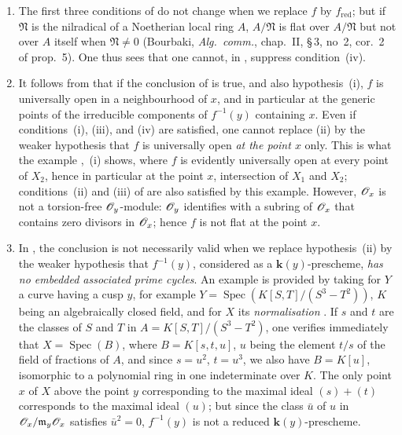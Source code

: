 \begin{remarks}[15.2.4]
\label{IV.15.2.4}
\begin{enumerate}[label=(\roman*)]
  \item The first three conditions of  do not change when we replace $f$ by $f_\mathrm{red}$; but if $\mathfrak{N}$ is the nilradical of a Noetherian local ring $A$, $A/\mathfrak{N}$ is flat over $A/\mathfrak{N}$ but not over $A$ itself when $\mathfrak{N}\neq 0$ (Bourbaki, \emph{Alg.\ comm.}, chap.~II, \S\,3, no~2, cor.~2 of prop.~5).
One thus sees that one cannot, in , suppress condition~(iv).
  \item It follows from  that if the conclusion of  is true, and also hypothesis~(i), $f$ is universally open in a neighbourhood of $x$, and in particular at the generic points of the irreducible components of $f^{-1}(y)$ containing $x$.
Even if conditions~(i), (iii), and (iv) are satisfied, one cannot replace (ii) by the weaker hypothesis that $f$ is universally open \emph{at the point $x$} only.
This is what the example ,~(i) shows, where $f$ is evidently universally open at every point of $X_2$, hence in particular at the point $x$, intersection of $X_1$ and $X_2$; conditions~(ii) and (iii) of  are also satisfied by this example.
However, $\mathscr{O}_x$ is not a torsion-free $\mathscr{O}_y$-module: $\mathscr{O}_y$ identifies with a subring of $\mathscr{O}_x$ that contains zero divisors in $\mathscr{O}_x$; hence $f$ is not flat at the point $x$.
  \item In , the conclusion is not necessarily valid when we replace hypothesis~(ii) by the weaker hypothesis that $f^{-1}(y)$, considered as a $\boldsymbol{k}(y)$-prescheme, \emph{has no embedded associated prime cycles}.
An example is provided by taking for $Y$ a curve having a cusp $y$, for example $Y=\operatorname{Spec}(K[S,T]/(S^3-T^2))$, $K$ being an algebraically closed field, and for $X$ its \emph{normalisation} .
If $s$ and $t$ are the classes of $S$ and $T$ in $A=K[S,T]/(S^3-T^2)$, one verifies immediately that $X=\operatorname{Spec}(B)$, where $B=K[s,t,u]$, $u$ being the element $t/s$ of the field of fractions of $A$, and since $s=u^2$, $t=u^3$, we also have $B=K[u]$, isomorphic to a polynomial ring in one indeterminate over $K$.
The only point $x$ of $X$ above the point $y$ corresponding to the maximal ideal $(s)+(t)$ corresponds to the maximal ideal $(u)$; but since the class $\bar{u}$ of $u$ in $\mathscr{O}_x/\mathfrak{m}_y\mathscr{O}_x$ satisfies $\bar{u}^2=0$, $f^{-1}(y)$ is not a reduced $\boldsymbol{k}(y)$-prescheme.

\end{enumerate}
\end{remarks}
